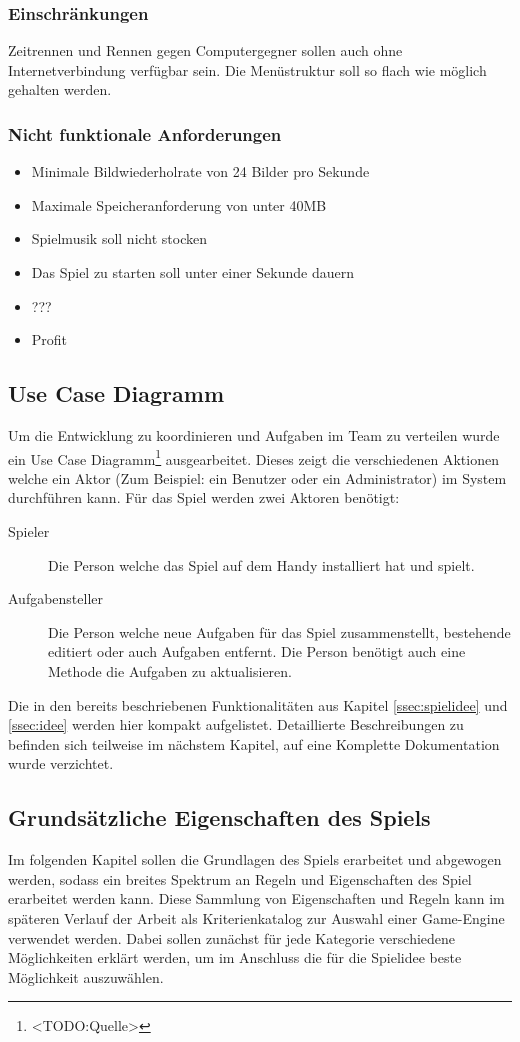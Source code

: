 	\subsubsection{Einschränkungen}
		Zeitrennen und Rennen gegen Computergegner sollen auch ohne Internetverbindung verfügbar sein.
		Die Menüstruktur soll so flach wie möglich gehalten werden.
	\subsubsection{Nicht funktionale Anforderungen}
		\begin{itemize}
			\item{ Minimale Bildwiederholrate von 24 Bilder pro Sekunde }
			\item{ Maximale Speicheranforderung von unter 40MB }
			\item{ Spielmusik soll nicht stocken }
			\item{ Das Spiel zu starten soll unter einer Sekunde dauern }
			\item{ ??? }
			\item{ Profit }
		\end{itemize}
\subsection{Use Case Diagramm}\label{ssec:ucd}
	Um die Entwicklung zu koordinieren und Aufgaben im Team zu verteilen wurde ein Use Case Diagramm\footnote{<TODO:Quelle>} ausgearbeitet. Dieses zeigt die verschiedenen Aktionen welche ein Aktor (Zum Beispiel: ein Benutzer oder ein Administrator) im System durchführen kann. Für das Spiel werden zwei Aktoren benötigt:
	\begin{description}
		\item[Spieler]{ Die Person welche das Spiel auf dem Handy installiert hat und spielt. }
		\item[Aufgabensteller]{ Die Person welche neue Aufgaben für das Spiel zusammenstellt, bestehende editiert oder auch Aufgaben entfernt. Die Person benötigt auch eine Methode die Aufgaben zu aktualisieren. }
	\end{description}
	Die in den bereits beschriebenen Funktionalitäten aus Kapitel \ref{ssec:spielidee} und \ref{ssec:idee} werden hier kompakt aufgelistet. Detaillierte Beschreibungen zu befinden sich teilweise im nächstem Kapitel, auf eine Komplette Dokumentation wurde verzichtet.

\subsection{Grundsätzliche Eigenschaften des Spiels}
	Im folgenden Kapitel sollen die Grundlagen des Spiels erarbeitet und abgewogen werden, sodass ein breites Spektrum an Regeln und Eigenschaften des Spiel erarbeitet werden kann. Diese Sammlung von Eigenschaften und Regeln kann im späteren Verlauf der Arbeit als Kriterienkatalog zur Auswahl einer Game-Engine verwendet werden. Dabei sollen zunächst für jede Kategorie verschiedene Möglichkeiten erklärt werden, um im Anschluss die für die Spielidee beste Möglichkeit auszuwählen.


